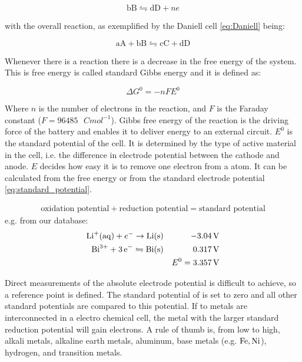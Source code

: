 	$$\text{bB} \leftrightharpoons \text{dD} + ne $$ 
	
	with the overall reaction, as exemplified by the Daniell cell  \ref{eq:Daniell} being: 
	
	\begin{equation}
	\text{aA} + \text{bB} \leftrightharpoons \text{cC} + \text{dD}
	\label{eq:redox}
	\end{equation}
	
	
	Whenever there is a reaction there is a decrease in the free energy of the system.  This is free energy is called standard Gibbs energy and it is defined as:  
	
	$$\Delta G^0 = -nFE^0$$
	
	Where $n$ is the number of electrons in the reaction, and $F$ is the Faraday constant ($F = 96485\text{ }\si{C mol^{-1}}$). Gibbs free energy of the reaction is the driving force of the battery and enables it to deliver energy to an external circuit. $E^0$ is the standard potential of the cell. It is determined by the type of active material in the cell, i.e. the difference in electrode potential between the cathode and anode. $E$ decides how easy it is to remove one electron from a atom. It can be calculated from the free energy or from the standard electrode potential \ref{eq:standard_potential}. 
	
\begin{align}\label{eq:standard_potential}	
\text{oxidation potential} + \text{reduction potential} = \text{standard potential}
\end{align}
	e.g. from our database:	
	\begin{align}
	\ce{Li^+(aq)} + e^- \rightarrow \ce{Li (s)} &  & \SI{-3.04}{V}\\
	\ce{Bi^{3+}} + \ce{3e^-} \leftrightharpoons \ce{Bi(s)} &  & \SI{0.317}{V} \\
		& &  E^0 =  \SI{3.357}{V}
 	\end{align}
	
	Direct measurements of the absolute electrode potential is difficult to achieve, so a reference point is defined. The standard potential of  is set to zero and all other standard potentials are compared to this potential. If to metals are interconnected in a electro chemical cell, the metal with the larger standard reduction potential will gain electrons. A rule of thumb is, from low to high, alkali metals, alkaline earth metals, aluminum, base metals (e.g. $\ce{Fe}, \ce{Ni}$), hydrogen, and transition metals. 
	
